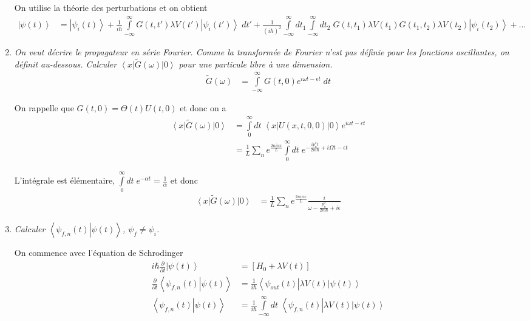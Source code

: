 \documentclass[10pt]{report}
\newcommand{\bra}[1]{\left<#1\right|}
\newcommand{\ket}[1]{\left|#1\right>}
\newcommand{\dotp}[2]{\left<#1\left.\right|#2\right>}
\newcommand{\pd}[2]{\frac{\partial #1}{\partial#2}}
\begin{document}
\begin{enumerate}[1)]
        On utilise la th\'eorie des perturbations et on obtient
        \begin{align}
            \ket{\psi(t)} &= \ket{\psi_{i}(t)} + \frac{1}{i\hbar}\int\limits_{-\infty}^{\infty}G(t,t')\lambda V(t')\ket{\psi_i(t')}\;dt' + \frac{1}{\left( i\hbar \right)^2}\int\limits_{-\infty}^{\infty}dt_1\int\limits_{-\infty}^{\infty}dt_2\;G(t,t_1)\lambda V(t_1) G(t_1, t_2) \lambda V(t_2) \ket{\psi_i(t_2)} +\dots\label{01.10.merde}
        \end{align}

    \item \emph{On veut d\'ecrire le propagateur en s\'erie Fourier. Comme la transform\'ee de Fourier n'est pas d\'efinie pour les fonctions oscillantes, on d\'efinit au-dessous. Calculer $\bra{x}\tilde{G}(\omega)\ket{0}$ pour une particule libre \`a une dimension.}
        \begin{align}
            \tilde{G}(\omega) &= \int\limits_{-\infty}^{\infty}G(t,0)e^{i\omega t - \epsilon t}\;dt
        \end{align}

        On rappelle que $G(t,0) = \Theta(t)U(t,0)$ et donc on a
        \begin{align}
            \bra{x}\tilde{G}(\omega)\ket{0} &= \int\limits_{0}^{\infty}dt\;\bra{x}U(x,t,0,0)\ket{0}e^{i\omega t - \epsilon t}\\
            &= \frac{1}{L}\sum\limits_{n}^{}e^{\frac{2n i \pi x}{L}}\int\limits_{0}^{\infty}dt\;e^{-\frac{ip_n^2t}{2m\hbar} + i\Omega t - \epsilon t}
        \end{align}

        L'int\'egrale est \'el\'ementaire, $\int\limits_{0}^{\infty}dt\;e^{-\alpha t} = \frac{1}{\alpha}$ et donc
        \begin{align}
            \bra{x}\tilde{G}(\omega)\ket{0} &= \frac{1}{L}\sum\limits_{n}^{}e^{\frac{2ni\pi x}{L}}\frac{i}{\omega - \frac{p_n^2}{2m\hbar} + i\epsilon}
        \end{align}

    \item \emph{Calculer $\dotp{\psi_{f,n}(t)}{\psi(t)}$, $\psi_f \neq \psi_i$.}

        On commence avec l'\'equation de Schrodinger
        \begin{align}
            i\hbar \pd{}{t}\ket{\psi(t)} &= \left[ H_0 + \lambda V(t) \right]\\
            \pd{}{t}\dotp{\psi_{f,n}(t)}{\psi(t)} &= \frac{1}{i\hbar}\bra{\psi_{out}(t)}\lambda V(t)\ket{\psi(t)}\\
            \dotp{\psi_{f,n}(t)}{\psi(t)} &= \frac{1}{i\hbar}\int\limits_{-\infty}^{\infty}dt\;\bra{\psi_{f,n}(t)}\lambda V(t)\ket{\psi(t)}
        \end{align}


\end{enumerate}
\end{document}
